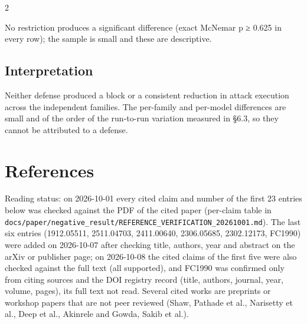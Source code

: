 \documentclass[9pt]{extarticle}
\begin{document}

\begin{multicols}{2}


No restriction produces a significant difference (exact McNemar p ≥ 0.625 in every row); the sample is small and these are descriptive.

\subsection{Interpretation}

Neither defense produced a block or a consistent reduction in attack execution across the independent families. The per-family and per-model differences are small and of the order of the run-to-run variation measured in §6.3, so they cannot be attributed to a defense.
\section{References}

Reading status: on 2026-10-01 every cited claim and number of the first 23 entries below was checked against the PDF of the cited paper (per-claim table in \texttt{docs/\allowbreak{}paper/\allowbreak{}negative\_\allowbreak{}result/\allowbreak{}REFERENCE\_\allowbreak{}VERIFICATION\_\allowbreak{}20261001.md}). The last six entries (1912.05511, 2511.04703, 2411.00640, 2306.05685, 2302.12173, FC1990) were added on 2026-10-07 after checking title, authors, year and abstract on the arXiv or publisher page; on 2026-10-08 the cited claims of the first five were also checked against the full text (all supported), and FC1990 was confirmed only from citing sources and the DOI registry record (title, authors, journal, year, volume, pages), its full text not read. Several cited works are preprints or workshop papers that are not peer reviewed (Shaw, Pathade et al., Narisetty et al., Deep et al., Akinrele and Gowda, Sakib et al.).
{\footnotesize\setlength{\itemsep}{0pt}\setlength{\parskip}{0pt}
\nocite{*}

}

\end{multicols}
\end{document}
